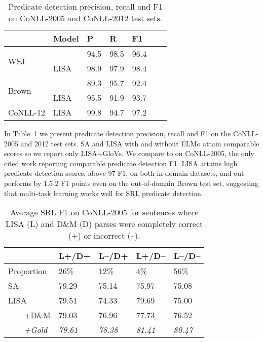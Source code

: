 \documentclass[11pt,a4paper]{article}
\begin{document}
\begin{table}
\setlength{\tabcolsep}{5pt}
\begin{tabular}{lllllll}




& Model & P & R & F1 \\ \hline \hline
\multirow{2}{*}{WSJ} & \citet{he2017deep} & 94.5 & 98.5 & 96.4  \\
& LISA & 98.9 &  97.9 & 98.4 \\ \hline

\multirow{2}{*}{Brown} & \citet{he2017deep} & 89.3 & 95.7 & 92.4 \\ 
& LISA & 95.5 &  91.9 &  93.7 \\ \hline

CoNLL-12 & LISA & 99.8 & 94.7 &	97.2 \\ 
\end{tabular}
\caption{Predicate detection precision, recall and F1 on CoNLL-2005 and CoNLL-2012 test sets. \label{tab:preds}}
\end{table}

In Table~\ref{tab:preds} we present predicate detection precision, recall and F1 on the CoNLL-2005 and 2012 test sets. SA and LISA with and without ELMo attain comparable scores so we report only LISA+GloVe. We compare to \citet{he2017deep} on CoNLL-2005, the only cited work reporting comparable predicate detection F1. LISA attains high predicate detection scores, above 97 F1, on both in-domain datasets, and out-performs \citet{he2017deep} by 1.5-2 F1 points even on the out-of-domain Brown test set, suggesting that multi-task learning works well for SRL predicate detection. 


\begin{table}

\begin{tabular}{lllll}
& L+/D+ & L--/D+ & L+/D-- & L--/D-- \\ \hline \hline
Proportion & 26\% &	12\% &	4\% &	56\% \\ \hline
SA & 79.29 & 75.14	& 75.97 &	75.08 \\ 
LISA & 79.51 &	74.33 &	79.69 &	75.00 \\
\ \ \ \ +D\&M & 79.03 &	76.96 &	77.73 &	76.52 \\
\ \ \ \ \emph{+Gold} & \emph{79.61} & \emph{78.38} & \emph{81.41} & \emph{80.47} \\
\end{tabular}
\caption{Average SRL F1 on CoNLL-2005 for sentences where LISA (L) and D\&M (D) parses were completely correct (+) or incorrect (--). \label{tab:parse-srl-by-sents}}
\end{table}
\end{document}
